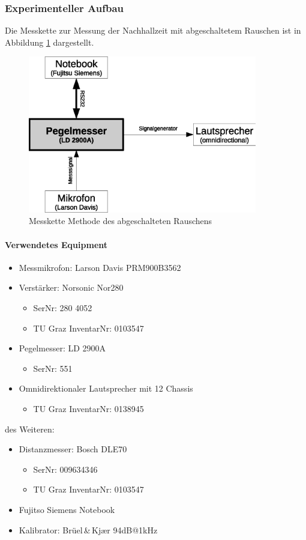 \documentclass[11pt]{report}
\begin{document}
\subsubsection{Experimenteller Aufbau}
Die Messkette zur Messung der Nachhallzeit mit abgeschaltetem Rauschen ist in Abbildung \ref{fig:rauschaufbau} dargestellt.
\begin{figure}[htbp]
\begin{center}
\includegraphics[width=10cm,keepaspectratio=true]{rauschaufbau}
\caption{Messkette Methode des abgeschalteten Rauschens}
\label{fig:rauschaufbau}
\end{center}
\end{figure}
\paragraph{Verwendetes Equipment}
\begin{itemize}
\item Messmikrofon: Larson Davis PRM900B3562
\item Verst\"arker: Norsonic Nor280
\begin{itemize}
\item SerNr: 280 4052
\item TU Graz InventarNr: 0103547
\end{itemize}
\item Pegelmesser: LD 2900A
\begin{itemize}
\item SerNr: 551
\end{itemize}
\item Omnidirektionaler Lautsprecher mit 12 Chassis
\begin{itemize}
\item TU Graz InventarNr: 0138945
\end{itemize}
\end{itemize}
des Weiteren:
\begin{itemize}
\item Distanzmesser: Bosch DLE70
\begin{itemize}
\item SerNr: 009634346
\item TU Graz InventarNr: 0103547
\end{itemize}
\item Fujitso Siemens Notebook
\item Kalibrator: Br\"uel\,\&\,Kj\ae r 94dB@1kHz
\end{itemize}
\end{document}
